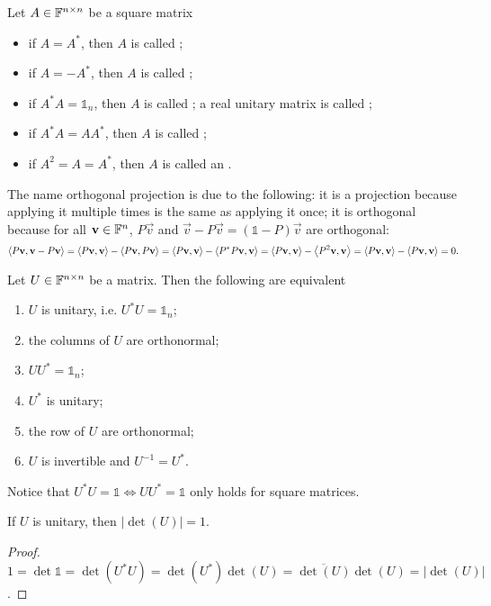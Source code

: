 \begin{definition}
Let $A\in\mathbb{F}^{n\times n}$ be a square matrix
\begin{itemize}
\item if $A=A^*$, then $A$ is called ;
\item if $A=-A^*$, then $A$ is called ;
\item if $A^*A=\mathbb{1}_n$, then $A$ is called ; a real unitary matrix is called ;
\item if $A^*A = AA^*$, then $A$ is called ;
\item if $A^2 = A = A^*$, then $A$ is called an .
\end{itemize}
\end{definition}
The name orthogonal projection is due to the following: it is a projection because applying it multiple times is the same as applying it once; it is orthogonal because for all $\bm{\mathrm{v}}\in\mathbb{F}^n$, $P\vec{v}$ and $\vec{v} - P\vec{v} = (\mathbb{1}-P)\vec{v}$ are orthogonal:
\[ \left\langle P\bm{\mathrm{v}},\bm{\mathrm{v}} - P\bm{\mathrm{v}} \right\rangle = \left\langle P\bm{\mathrm{v}},\bm{\mathrm{v}} \right\rangle - \left\langle P\bm{\mathrm{v}},P\bm{\mathrm{v}} \right\rangle = \left\langle P\bm{\mathrm{v}},\bm{\mathrm{v}} \right\rangle - \left\langle P^*P\bm{\mathrm{v}},\bm{\mathrm{v}} \right\rangle = \left\langle P\bm{\mathrm{v}},\bm{\mathrm{v}} \right\rangle - \left\langle P^2\bm{\mathrm{v}},\bm{\mathrm{v}} \right\rangle = \left\langle P\bm{\mathrm{v}},\bm{\mathrm{v}} \right\rangle - \left\langle P\bm{\mathrm{v}},\bm{\mathrm{v}} \right\rangle = 0. \]

\begin{lemma}
Let $U\in\mathbb{F}^{n\times n}$ be a matrix. Then the following are equivalent
\begin{enumerate}
\item $U$ is unitary, i.e. $U^*U=\mathbb{1}_n$;
\item the columns of $U$ are orthonormal;
\item $UU^*=\mathbb{1}_n$;
\item $U^*$ is unitary;
\item the row of $U$ are orthonormal;
\item $U$ is invertible and $U^{-1} = U^*$.
\end{enumerate}
\end{lemma}
Notice that $U^*U=\mathbb{1} \iff UU^*=\mathbb{1}$ only holds for square matrices.

\begin{lemma}
If $U$ is unitary, then $|\det(U)| = 1$.
\end{lemma}
\begin{proof}
$1=\det{\mathbb{1}} = \det(U^*U) = \det(U^*)\det(U) = \overline{\det(U)}\det(U) = |\det(U)|$.
\end{proof}


